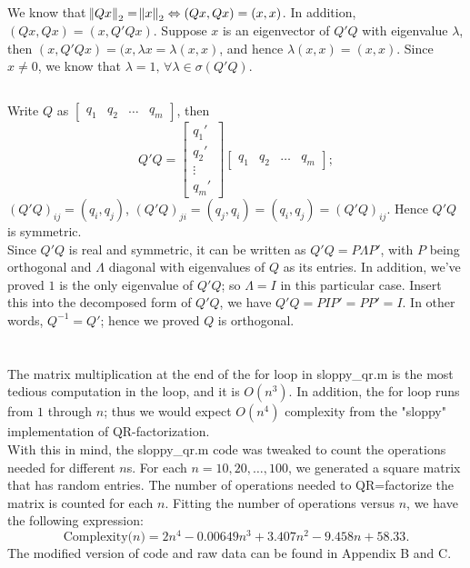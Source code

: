 \documentclass[11pt]{article}
\begin{document}
\subsection{}
We know that $\norm{Qx}_2=\norm{x}_2\Leftrightarrow(Qx,Qx)=(x,x)$. In addition, $(Qx, Qx)=(x,Q'Qx)$. Suppose $x$ is an eigenvector of $Q'Q$ with eigenvalue $\lambda$, then $(x,Q'Qx)=(x,\lambda x=\lambda(x,x)$, and hence $\lambda(x,x)=(x,x)$. Since $x\neq0$, we know that $\lambda=1,\,\forall\lambda\in\sigma(Q'Q)$.
\subsection{}
Write $Q$ as $\begin{bmatrix} q_1 & q_2 & \dots &q_m\end{bmatrix}$, then $$Q'Q=\begin{bmatrix} q_1'\\q_2'\\\vdots\\q_m'\end{bmatrix}\begin{bmatrix} q_1&q_2&\dots&q_m\end{bmatrix}; $$ $(Q'Q)_{ij}=(q_i,q_j)$, $(Q'Q)_{ji}=(q_j,q_i)=(q_i,q_j)=(Q'Q)_{ij}$. Hence $Q'Q$ is symmetric.\\[0.5cm]
Since $Q'Q$ is real and symmetric, it can be written as $Q'Q=P\Lambda P'$, with $P$ being orthogonal and $\Lambda$ diagonal with eigenvalues of $Q$ as its entries. In addition, we've proved $1$ is the only eigenvalue of $Q'Q$; so $\Lambda=I$ in this particular case. Insert this into the decomposed form of $Q'Q$, we have $Q'Q=PIP'=PP'=I$. In other words, $Q^{-1}=Q'$; hence we proved $Q$ is orthogonal.
\section{}
The matrix multiplication at the end of the for loop in sloppy\_qr.m is the most tedious computation in the loop, and it is $O(n^3)$. In addition, the for loop runs from $1$ through $n$; thus we would expect $O(n^4)$ complexity from the "sloppy" implementation of QR-factorization.\\[0.5cm] 
With this in mind, the sloppy\_qr.m code was tweaked to count the operations needed for different $n$s. For each $n=10,20,\dots,100$, we generated a square matrix that has random entries. The number of operations needed to QR=factorize the matrix is counted for each $n$. Fitting the number of operations versus $n$, we have the following expression: 
$$\mathrm{Complexity(}n\mathrm{)}=2n^4-0.00649n^3+3.407n^2-9.458n+58.33.$$
The modified version of code and raw data can be found in Appendix B and C.
\end{document}
